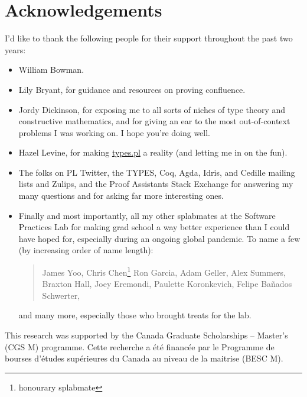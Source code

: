 \chapter{Acknowledgements}

I'd like to thank the following people for their support throughout the past two years:

\begin{itemize}
  \item William Bowman.
  \item Lily Bryant, for guidance and resources on proving confluence.
  \item Jordy Dickinson, for exposing me to all sorts of niches of type theory and constructive mathematics,
    and for giving an ear to the most out-of-context problems I was working on.
    I hope you're doing well.
  \item Hazel Levine, for making \href{https://types.pl/}{types.pl} a reality (and letting me in on the fun).
  \item The folks on PL Twitter, the TYPES, Coq, Agda, Idris, and Cedille mailing lists and Zulips,
    and the Proof Assistants Stack Exchange for answering my many questions
    and for asking far more interesting ones.
  \item Finally and most importantly, all my other splabmates at the Software Practices Lab
    for making grad school a way better experience than I could have hoped for,
    especially during an ongoing global pandemic.
    To name a few (by increasing order of name length):
    \begin{quote}
    James Yoo, Chris Chen\punctstack{,}\footnote{honourary splabmate} Ron Garcia, Adam Geller, Alex Summers,
    Braxton Hall, Joey Eremondi, Paulette Koronkevich, Felipe Ba\~nados Schwerter,
    \end{quote}
    and many more, especially those who brought treats for the lab.
\end{itemize}

\vfill

This research was supported by the Canada Graduate Scholarships -- Master’s (CGS M) programme.
Cette recherche a \'et\'e financ\'ee par le Programme de bourses d'\'etudes sup\'erieures
du Canada au niveau de la maitrise (BESC M).

\hfill